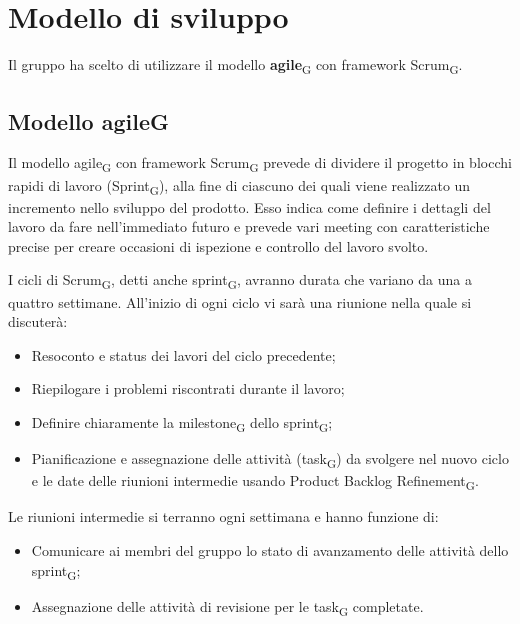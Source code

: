 \section{Modello di sviluppo}
Il gruppo ha scelto di utilizzare il modello \textbf{agile}\textsubscript{G} con framework Scrum\textsubscript{G}.

\subsection{Modello agile{G}}
Il modello agile\textsubscript{G} con framework Scrum\textsubscript{G} prevede di dividere il progetto in blocchi rapidi di lavoro (Sprint\textsubscript{G}),
alla fine di ciascuno dei quali viene realizzato un incremento nello sviluppo del prodotto. 
Esso indica come definire i dettagli del lavoro da fare nell'immediato futuro e prevede 
vari meeting con caratteristiche precise per creare occasioni di ispezione e controllo del lavoro svolto.

I cicli di Scrum\textsubscript{G}, detti anche sprint\textsubscript{G}, avranno durata che variano da una a quattro settimane. All'inizio di ogni ciclo vi sarà una riunione nella quale si discuterà:
\begin{itemize}
	\item Resoconto e status dei lavori del ciclo precedente;
	\item Riepilogare i problemi riscontrati durante il lavoro;
	\item Definire chiaramente la milestone\textsubscript{G} dello sprint\textsubscript{G};
	\item Pianificazione e assegnazione delle attività (task\textsubscript{G}) da svolgere nel nuovo ciclo e le date delle riunioni intermedie usando Product Backlog Refinement\textsubscript{G}.
\end{itemize}
Le riunioni intermedie si terranno ogni settimana e hanno funzione di:
\begin{itemize}
	\item Comunicare ai membri del gruppo lo stato di avanzamento delle attività dello sprint\textsubscript{G};
	\item Assegnazione delle attività di revisione per le task\textsubscript{G} completate.
\end{itemize}

\newpage
